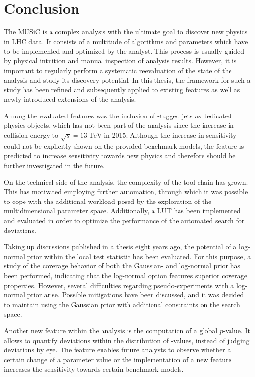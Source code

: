 
\chapter{Conclusion}
The \acf{MUSiC} is a complex analysis with the ultimate goal to discover new physics in \ac{LHC} data. It consists of a multitude of algorithms and parameters which have to be implemented and optimized by the analyst. This process is usually guided by physical intuition and manual inspection of analysis results. However, it is important to regularly perform a systematic reevaluation of the state of the analysis and  study its discovery potential.
In this thesis, the framework for such a study has been refined and subsequently applied to existing features as well as newly introduced extensions of the analysis.

Among the evaluated features was the inclusion of \Pqb-tagged jets as dedicated physics objects, which has not been part of the analysis since the increase in collision energy to $\sqrt{s} = \SI{13}{\TeV}$ in 2015. Although the increase in sensitivity could not be explicitly shown on the provided benchmark models, the feature is predicted to increase sensitivity towards new physics and therefore should be further investigated in the future.

On the technical side of the analysis, the complexity of the tool chain has grown. This has motivated employing further automation, through which it was possible to cope with the additional workload posed by the exploration of the multidimensional parameter space.
Additionally, a \acl{LUT} has been implemented and evaluated in order to optimize the performance of the automated search for deviations.

Taking up discussions published in a thesis eight years ago\cite{Schmitz:ModelUnspecificSearch}, the potential of a log-normal prior within the local test statistic has been evaluated. For this purpose, a study of the coverage behavior of both the Gaussian- and log-normal prior has been performed, indicating that the log-normal option features superior coverage properties. However, several difficulties regarding pseudo-experiments with a log-normal prior arise. Possible mitigations have been discussed, and it was decided to maintain using the Gaussian prior with additional constraints on the search space.

Another new feature within the analysis is the computation of a global $p$-value. It allows to quantify deviations within the distribution of \ptilde-values, instead of judging deviations by eye. The feature enables future analysts to observe whether a certain change of a parameter value or the implementation of a new feature increases the sensitivity towards certain benchmark models.

